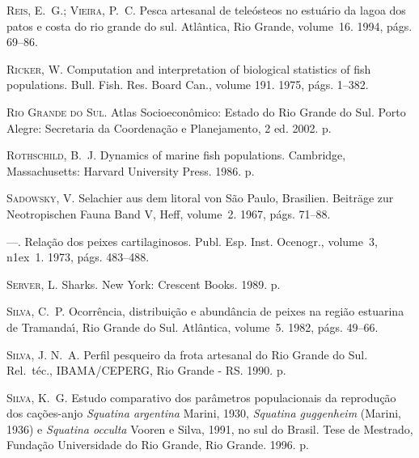 \documentclass[a4paper,11pt,twoside,showtrims,onecolumn,openright,final]{memoir}
\begin{document}
\begin{thebibliography}{194}
\textsc{Reis, E.~G.; Vieira, P.~C.}
\newblock Pesca artesanal de teleósteos no estuário da lagoa dos patos e costa
  do rio grande do sul.
\newblock Atlântica, Rio Grande, volume~16. 1994, p\'ags. 69--86.

\textsc{Ricker, W.}
\newblock Computation and interpretation of biological statistics of fish
  populations.
\newblock Bull. Fish. Res. Board Can., volume 191. 1975, p\'ags. 1--382.

\textsc{{Rio Grande do Sul}}.
\newblock Atlas {S}ocioecon\^omico: {E}stado do {R}io {G}rande do {S}ul.
\newblock Porto Alegre: Secretaria da Coordena\c{c}\~ao e Planejamento, 2 ed.
  2002.
 p.

\textsc{Rothschild, B.~J.}
\newblock Dynamics of marine fish populations.
\newblock Cambridge, Massachusetts: Harvard University Press. 1986.
 p.

\textsc{Sadowsky, V.}
\newblock Selachier aus dem litoral von {S}\~ao {P}aulo, {B}rasilien.
\newblock Beitr\"age zur Neotropischen Fauna Band V, Heff, volume~2. 1967,
  p\'ags. 71--88.

---.
\newblock Rela\c{c}\~ao dos peixes cartilaginosos.
\newblock Publ. Esp. Inst. Ocenogr., volume~3,
  n\raise1ex\hbox{}~1. 1973, p\'ags. 483--488.

\textsc{Server, L.}
\newblock Sharks.
\newblock New York: Crescent Books. 1989.
 p.

\textsc{Silva, C.~P.}
\newblock Ocorr\^encia, distribui\c{c}\~ao e abund\^ancia de peixes na regi\~ao
  estuarina de {T}ramanda\'{\i}, {R}io {G}rande do {S}ul.
\newblock Atl\^antica, volume~5. 1982, p\'ags. 49--66.

\textsc{Silva, J. N.~A.}
\newblock Perfil pesqueiro da frota artesanal do {R}io {G}rande do {S}ul.
\newblock Rel.\ t\'ec., IBAMA/CEPERG, Rio Grande - RS. 1990.
 p.

\textsc{Silva, K.~G.}
\newblock Estudo comparativo dos par\^ametros populacionais da reprodu\c{c}\~ao
  dos ca\c{c}\~oes-anjo \emph{{S}quatina argentina} {M}arini, 1930, \emph{{S}quatina
  guggenheim} ({M}arini, 1936) e \emph{{S}quatina occulta} {V}ooren e {S}ilva, 1991, no
  sul do {B}rasil.
\newblock Tese de Mestrado, Funda\c{c}\~ao Universidade do Rio Grande, Rio
  Grande. 1996.
 p.


\end{thebibliography}
\end{document}
